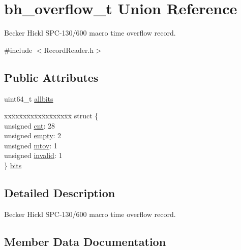 \hypertarget{unionbh__overflow__t}{}\section{bh\+\_\+overflow\+\_\+t Union Reference}
\label{unionbh__overflow__t}


Becker Hickl S\+P\+C-\/130/600 macro time overflow record.  




{\ttfamily \#include $<$Record\+Reader.\+h$>$}

\subsection*{Public Attributes}
\begin{DoxyCompactItemize}
\item 
uint64\+\_\+t \hyperlink{unionbh__overflow__t_a1a539268e7e43c5fec958408c5844689}{allbits}
\item 
\begin{tabbing}
xx\=xx\=xx\=xx\=xx\=xx\=xx\=xx\=xx\=\kill
struct \{\\
\>unsigned \hyperlink{unionbh__overflow__t_a5f8e8d6c40937ad58d696836abca12b5}{cnt}: 28\\
\>unsigned \hyperlink{unionbh__overflow__t_ab10179360d58b5e27b52c8f14a9359ed}{empty}: 2\\
\>unsigned \hyperlink{unionbh__overflow__t_a2782e17c346ef069fd780760162aa140}{mtov}: 1\\
\>unsigned \hyperlink{unionbh__overflow__t_a55822516cedb8a099d4e595d1fc0dfe7}{invalid}: 1\\
\} \hyperlink{unionbh__overflow__t_ab581988a4d53af602d9edd9925692234}{bits}\\

\end{tabbing}\end{DoxyCompactItemize}


\subsection{Detailed Description}
Becker Hickl S\+P\+C-\/130/600 macro time overflow record. 

\subsection{Member Data Documentation}
\mbox{\label{unionbh__overflow__t_a1a539268e7e43c5fec958408c5844689}} 
